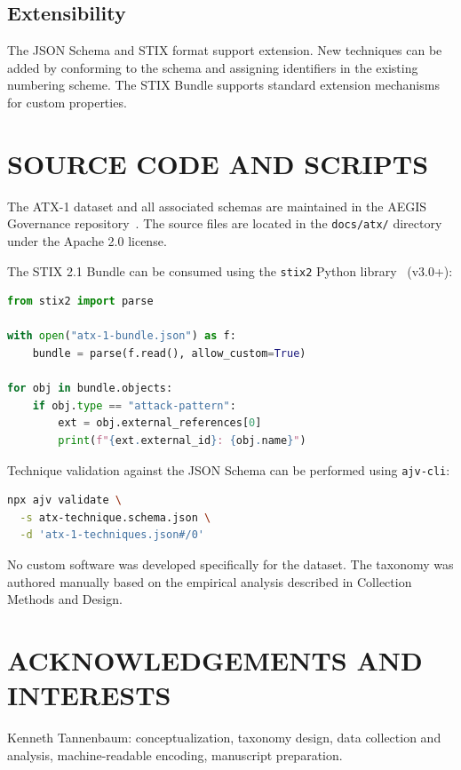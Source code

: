 \documentclass{IEEEoj-data}
\begin{document}
\subsection*{Extensibility}

The JSON Schema and STIX format support extension. New techniques can be added by conforming to the schema and assigning identifiers in the existing numbering scheme. The STIX Bundle supports standard extension mechanisms for custom properties.


\section*{SOURCE CODE AND SCRIPTS}

The ATX-1 dataset and all associated schemas are maintained in the AEGIS Governance repository~\cite{ref14}. The source files are located in the \texttt{docs/atx/} directory under the Apache 2.0 license.

The STIX 2.1 Bundle can be consumed using the \texttt{stix2} Python library~\cite{ref15} (v3.0+):

\begin{lstlisting}[language=Python]
from stix2 import parse

with open("atx-1-bundle.json") as f:
    bundle = parse(f.read(), allow_custom=True)

for obj in bundle.objects:
    if obj.type == "attack-pattern":
        ext = obj.external_references[0]
        print(f"{ext.external_id}: {obj.name}")
\end{lstlisting}

Technique validation against the JSON Schema can be performed using \texttt{ajv-cli}:

\begin{lstlisting}[language=bash]
npx ajv validate \
  -s atx-technique.schema.json \
  -d 'atx-1-techniques.json#/0'
\end{lstlisting}

No custom software was developed specifically for the dataset. The taxonomy was authored manually based on the empirical analysis described in Collection Methods and Design.


\section*{ACKNOWLEDGEMENTS AND INTERESTS}

Kenneth Tannenbaum: conceptualization, taxonomy design, data collection and analysis, machine-readable encoding, manuscript preparation.
\end{document}
